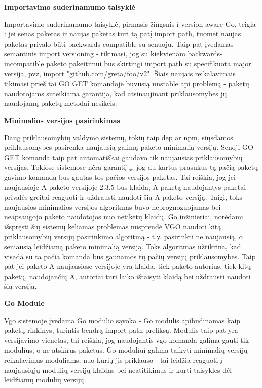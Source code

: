 \bigbreak
{\bf Importavimo suderinamumo taisyklė}
\bigbreak

Importavimo suderinamumo taisyklė, pirmasis žingsnis į version-aware Go, teigia :
 jei senas paketas ir naujas paketas turi tą patį import path, tuomet naujas paketas privalo būti backwards-compatible su senuoju. Taip pat įvedamas semantinis import versioning - tikimasi, jog su kiekvienam backwards-incompatible paketo pakeitimui bus skirtingi import path su specifikuota major versija, pvz, import "github.com/greta/foo/v2". Šiais naujais reikalavimais tikimasi prieš tai GO GET komandoje buvusią unstable api problemą - paketų naudotojams suteikiama garantija, kad atsinaujinant priklausomybes jų naudojamų paketų metodai nesikeis.

\bigbreak
{\bf Minimalios versijos pasirinkimas}
\bigbreak

Daug priklausomybių valdymo sistemų, tokių taip dep ar npm,  siųsdamos priklausomybes pasirenka naujausią galimą paketo minimalią versiją. Senoji GO GET komanda taip pat automatiškai gaudavo tik naujausias priklausomybių versijas. Tokiose sistemose nėra garantijų, jog du kartus prasukus tą pačią paketų gavimo komandą bus gautas tos pačios versijos paketas. Tai reiškia, jog jei naujausioje A paketo versijoje 2.3.5 bus klaida, A paketą naudojantys paketai privalės greitai reaguoti ir uždrausti naudoti šią A paketo versiją. Taigi, toks naujausios minimalios versijos algoritmas buvo neprognozuojamas bei neapsaugojo paketo naudotojos nuo netikėtų klaidų. Go inžinieriai, norėdami išspręsti šių sistemų keliamas problemas nusprendė VGO naudoti kitą priklausomybių versijų pasirinkimo algoritmą - t.y. pasirinkti ne naujausią, o seniausią leidžiamą paketo minimalią versiją. Toks algoritmas užtikrina, kad visada su ta pačia komanda bus gaunamos tų pačių versijų priklausomybės. Taip pat jei paketo A naujausiose versijoje yra klaida, tiek paketo autorius, tiek kitų paketų, naudojančių A, autoriai turi laiko ištaisyti klaidą bei uždrausti naudoti šią versiją.

\bigbreak
{\bf Go Module}
\bigbreak

Vgo sistemoje įvedama Go modulio sąvoka - Go modulis apibūdinamas kaip paketų rinkinys, turintis bendrą import path prefiksą. Modulis taip pat yra versijavimo vienetas, tai reiškia, jog naudojantis vgo komanda galima gauti tik modulius, o ne atskirus paketus. Go moduliui galima taikyti minimalių versijų reikalavimus moduliams, nuo kurių jis priklauso - tai leidžia reaguoti į naujausiųjų modulių versijų klaidas bei neatitikimus ir kurti taisykles dėl leidžiamų modulių versijų.

